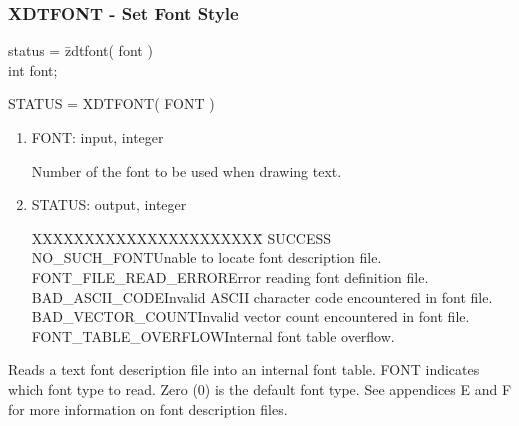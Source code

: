 \subsubsection{XDTFONT - Set Font Style}
\begin{tabbing}
status = \=zdtfont( font )\\
\>int  font;\\
\end{tabbing}
STATUS = XDTFONT( FONT )
\begin{enumerate}
\item FONT:  input, integer

Number of the font to be used when drawing text.
\item STATUS:  output, integer
\begin{tabbing}
XXXXXXXXXXXXXXXXXXXXXX\=\kill
SUCCESS\\
NO\_SUCH\_FONT\>Unable to locate font description file.\\
FONT\_FILE\_READ\_ERROR\>Error reading font definition file.\\
BAD\_ASCII\_CODE\>Invalid ASCII character code encountered in font file.\\
BAD\_VECTOR\_COUNT\>Invalid vector count encountered in font file.\\
FONT\_TABLE\_OVERFLOW\>Internal font table overflow.\\
\end{tabbing}
\end{enumerate}
Reads a text font description file into an internal font table.  FONT
indicates which font type to read.  Zero (0) is the default font
type.  See appendices E and F for more information on font
description files.
\newpage
